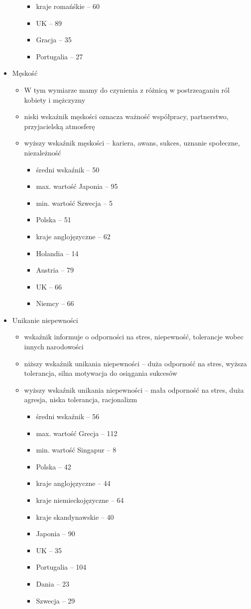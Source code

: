 \documentclass[a4paper,10pt]{report}
\begin{document}
\begin{itemize}
\begin{itemize}
\begin{itemize}
			\item kraje romańśkie -- 60
			\item UK -- 89
			\item Gracja -- 35
			\item Portugalia -- 27
		\end{itemize}
	\end{itemize}
	\item Męskość
	\begin{itemize}
		\item W tym wymiarze mamy do czynienia z różnicą w postrzeaganiu ról kobiety i mężczyzny
		\item niski wskaźnik męskości oznacza ważność współpracy, partnerstwo, przyjacielską atmosferę
		\item wyższy wskaźnik męskości -- kariera, awans, sukces, uznanie społeczne, niezależność
		\begin{itemize}
			\item średni wskaźnik -- 50
			\item max. wartość Japonia -- 95
			\item min. wartość Szwecja -- 5
			\item Polska -- 51
			\item kraje anglojęzyczne -- 62
			\item Holandia -- 14
			\item Austria -- 79
			\item UK -- 66
			\item Niemcy -- 66
		\end{itemize}
	\end{itemize}
	\item Unikanie niepewności
	\begin{itemize}
		\item wskaźnik informuje o odporności na stres, niepewność, tolerancje wobec innych narodowości
		\item niższy wskaźnik unikania niepewności -- duża odporność na stres, wyższa tolerancja, silna motywacja do osiągania sukcesów
		\item wyższy wskaźnik unikania niepewności -- mała odporność na stres, duża agresja, niska tolerancja, racjonalizm
		\begin{itemize}
			\item średni wskaźnik -- 56
			\item max. wartość Grecja -- 112
			\item min. wartość Singapur -- 8
			\item Polska -- 42
			\item kraje anglojęzyczne -- 44
			\item kraje niemieckojęzyczne -- 64 
			\item kraje skandynawskie -- 40
			\item Japonia -- 90
			\item UK -- 35
			\item Portugalia -- 104
			\item Dania -- 23
			\item Szwecja -- 29
		\end{itemize}
	\end{itemize}
\end{itemize}
\end{document}
